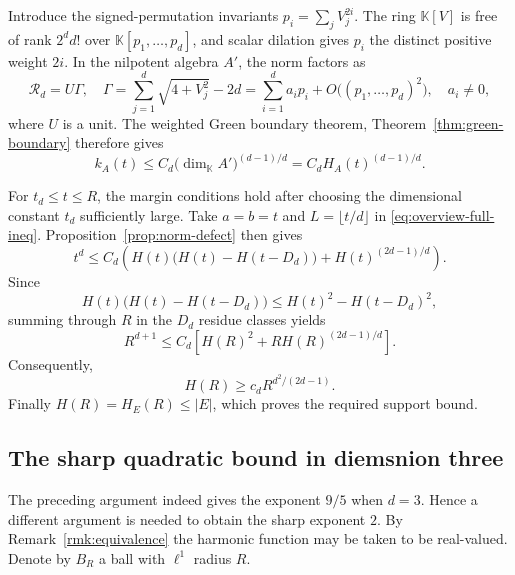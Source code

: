 \documentclass[11pt,reqno]{amsart}
\newcommand\K{\ensuremath{\mathbb{K}}}
\theoremstyle{definition}
\theoremstyle{plain}
\numberwithin{equation}{section}
\begin{document}
Introduce the signed-permutation invariants
$p_i=\sum_jV_j^{2i}$. The ring $\K[V]$ is free of rank $2^dd!$
over $\K[p_1,\ldots,p_d]$, and scalar dilation gives $p_i$ the
distinct positive weight $2i$. In the nilpotent algebra $A'$, the
norm factors as
\begin{equation*}
    \mathcal R_d=U\Gamma,\quad
    \Gamma=
    \sum_{j=1}^d\sqrt{4+V_j^2}-2d
    =
    \sum_{i=1}^da_ip_i
    +O\bigl((p_1,\ldots,p_d)^2\bigr),
    \quad a_i\neq0,
\end{equation*}
where $U$ is a unit. The weighted Green boundary theorem, Theorem~\ref{thm:green-boundary} therefore
gives
\begin{equation*}
    k_A(t)
    \leq
    C_d\bigl(\dim_\K A'\bigr)^{(d-1)/d}
    =
    C_dH_A(t)^{(d-1)/d}.
\end{equation*}

For $t_d\leq t\leq R$, the margin conditions hold after choosing the
dimensional constant $t_d$ sufficiently large. Take
$a=b=t$ and $L=\lfloor t/d\rfloor$ in
\eqref{eq:overview-full-ineq}. Proposition~\ref{prop:norm-defect}
then gives
\begin{equation*}
    t^d
    \leq
    C_d\left(H(t)\bigl(H(t)-H(t-D_d)\bigr)+H(t)^{(2d-1)/d}\right).
\end{equation*}
Since
\begin{equation*}
    H(t)\bigl(H(t)-H(t-D_d)\bigr)
    \leq
    H(t)^2-H(t-D_d)^2,
\end{equation*}
summing through $R$ in the $D_d$ residue classes yields
\begin{equation*}
    R^{d+1}
    \leq
    C_d\left[
        H(R)^2+RH(R)^{(2d-1)/d}
    \right].
\end{equation*}
Consequently,
\begin{equation*}
    H(R)\geq c_dR^{d^2/(2d-1)}.
\end{equation*}
Finally $H(R)=H_E(R)\leq |E|$, which proves the required support
bound. 
\subsection{The sharp quadratic bound in diemsnion three} The preceding argument indeed gives the exponent $9/5$ when $d=3$. Hence a different argument is needed to obtain the sharp exponent $2$. By Remark~\ref{rmk:equivalence} the harmonic function may be taken to be real-valued. Denote by $B_R$ a ball with $\ell^1$ radius $R$. 
\end{document}
